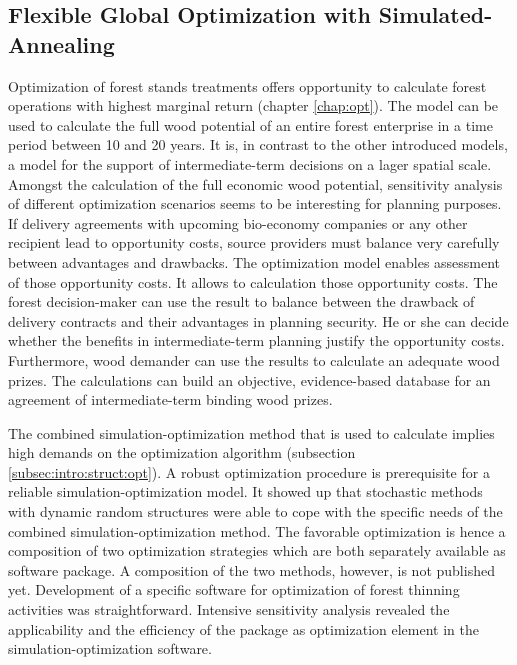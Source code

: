 \subsection{Flexible Global Optimization with Simulated-Annealing}
\label{subsec:discussion:struct:opt}
Optimization of forest stands treatments offers opportunity to calculate forest operations with highest marginal return (chapter \ref{chap:opt}). The model can be used to calculate the full wood potential of an entire forest enterprise in a time period between 10 and 20 years. It is, in contrast to the other introduced models, a model for the support of intermediate-term decisions on a lager spatial scale. Amongst the calculation of the full economic wood potential, sensitivity analysis of different optimization scenarios seems to be interesting for planning purposes. If delivery agreements with upcoming bio-economy companies or any other recipient lead to opportunity costs, source providers must balance very carefully between advantages and drawbacks. The optimization model enables assessment of those opportunity costs. It allows to calculation those opportunity costs. The forest decision-maker can use the result to balance between the drawback of delivery contracts and their advantages in planning security. He or she can decide whether the benefits in intermediate-term planning justify the opportunity costs. Furthermore, wood demander can use the results to calculate an adequate wood prizes. The calculations can build an objective, evidence-based database for an agreement of intermediate-term binding wood prizes.

The combined simulation-optimization method that is used to calculate implies high demands on the optimization algorithm (subsection \ref{subsec:intro:struct:opt}). A robust optimization procedure is prerequisite for a reliable simulation-optimization model. It showed up that stochastic methods with dynamic random structures were able to cope with the specific needs of the combined simulation-optimization method. The favorable optimization is hence a composition of two optimization strategies \citep{kirkpatrick_1983, pronzato_1984} which are both separately available as software package. A composition of the two methods, however, is not published yet. Development of a specific software for optimization of forest thinning activities was straightforward. Intensive  sensitivity analysis revealed the applicability and the efficiency of the package as optimization element in the simulation-optimization software.

